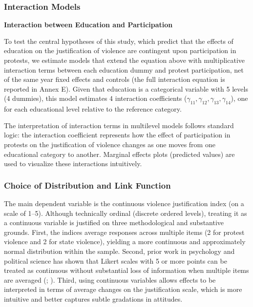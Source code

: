 \documentclass[
  13pt,
]{article}
\begin{document}
\subsubsection{Interaction Models}\label{interaction-models}

\textbf{Interaction between Education and Participation}

To test the central hypotheses of this study, which predict that the
effects of education on the justification of violence are contingent
upon participation in protests, we estimate models that extend the
equation above with multiplicative interaction terms between each
education dummy and protest participation, net of the same year fixed
effects and controls (the full interaction equation is reported in Annex
E). Given that education is a categorical variable with 5 levels (4
dummies), this model estimates 4 interaction coefficients
(\(\gamma_{11}, \gamma_{12}, \gamma_{13}, \gamma_{14}\)), one for each
educational level relative to the reference category.

The interpretation of interaction terms in multilevel models follows
standard logic: the interaction coefficient represents how the effect of
participation in protests on the justification of violence changes as
one moves from one educational category to another. Marginal effects
plots (predicted values) are used to visualize these interactions
intuitively.

\subsubsection{Choice of Distribution and Link
Function}\label{choice-of-distribution-and-link-function}

The main dependent variable is the continuous violence justification
index (on a scale of 1--5). Although technically ordinal (discrete
ordered levels), treating it as a continuous variable is justified on
three methodological and substantive grounds. First, the indices average
responses across multiple items (2 for protest violence and 2 for state
violence), yielding a more continuous and approximately normal
distribution within the sample. Second, prior work in psychology and
political science has shown that Likert scales with 5 or more points can
be treated as continuous without substantial loss of information when
multiple items are averaged (; ). Third,
using continuous variables allows effects to be interpreted in terms of
average changes on the justification scale, which is more intuitive and
better captures subtle gradations in attitudes.
\end{document}
